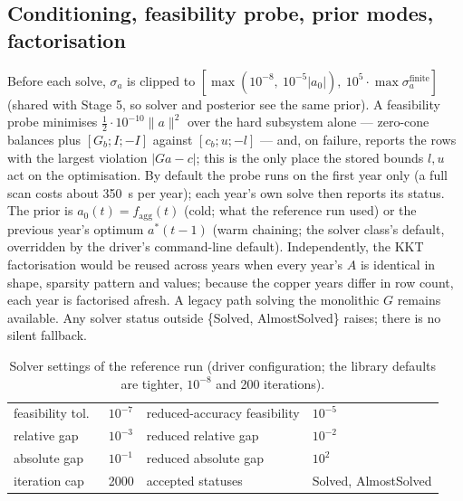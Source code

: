 \documentclass[11pt]{article}
\begin{document}
\subsection{Conditioning, feasibility probe, prior modes, factorisation}
Before each solve, $\sigma_a$ is clipped to
$[\max(10^{-8},\ 10^{-5}|a_0|),\ 10^{5}\cdot\max\sigma_a^{\mathrm{finite}}]$
(shared with Stage 5, so solver and posterior see the same prior). A
feasibility probe minimises $\tfrac12\cdot10^{-10}\|a\|^2$ over the hard
subsystem alone --- zero-cone balances plus $[G_b; I; -I]$ against
$[c_b; u; -l]$ --- and, on failure, reports the rows with the largest
violation $|G a - c|$; this is the only place the stored bounds $l, u$ act
on the optimisation. By default the probe runs on the first year only (a
full scan costs about 350~s per year); each year's own solve then reports its
status. The prior is $a_0(t) = f_{\mathrm{agg}}(t)$ (cold; what the
reference run used) or the previous year's optimum $a^*(t{-}1)$ (warm
chaining; the solver class's default, overridden by the driver's
command-line default). Independently, the KKT factorisation would be reused
across years when every year's $A$ is identical in shape, sparsity pattern
and values; because the copper years differ in row count, each year is
factorised afresh. A legacy path solving the monolithic $G$ remains
available. Any solver status outside \{Solved, AlmostSolved\} raises; there
is no silent fallback.

\begin{table}[h]
\centering\small
\begin{tabular}{@{}llll@{}}
\toprule
feasibility tol.\ & $10^{-7}$ & reduced-accuracy feasibility & $10^{-5}$ \\
relative gap & $10^{-3}$ & reduced relative gap & $10^{-2}$ \\
absolute gap & $10^{-1}$ & reduced absolute gap & $10^{2}$ \\
iteration cap & 2000 & accepted statuses & Solved, AlmostSolved \\
\bottomrule
\end{tabular}
\caption{Solver settings of the reference run (driver configuration; the
library defaults are tighter, $10^{-8}$ and 200 iterations).}
\label{tab:si-settings}
\end{table}
\end{document}
